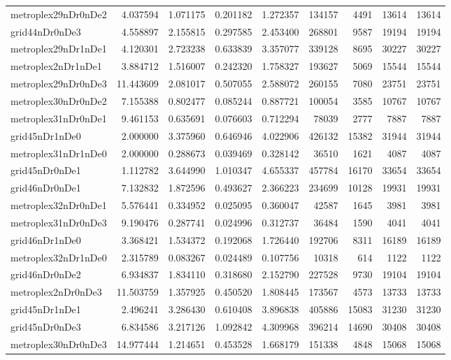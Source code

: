 \begin{longtable}{|l|r|r|r|r|r|r|r|r|}
metroplex29nDr0nDe2 & 4.037594 & 1.071175 & 0.201182 & 1.272357 & 134157 & 4491 & 13614 & 13614 \\
grid44nDr0nDe3 & 4.558897 & 2.155815 & 0.297585 & 2.453400 & 268801 & 9587 & 19194 & 19194 \\
metroplex29nDr1nDe1 & 4.120301 & 2.723238 & 0.633839 & 3.357077 & 339128 & 8695 & 30227 & 30227 \\
metroplex2nDr1nDe1 & 3.884712 & 1.516007 & 0.242320 & 1.758327 & 193627 & 5069 & 15544 & 15544 \\
metroplex29nDr0nDe3 & 11.443609 & 2.081017 & 0.507055 & 2.588072 & 260155 & 7080 & 23751 & 23751 \\
metroplex30nDr0nDe2 & 7.155388 & 0.802477 & 0.085244 & 0.887721 & 100054 & 3585 & 10767 & 10767 \\
metroplex31nDr0nDe1 & 9.461153 & 0.635691 & 0.076603 & 0.712294 & 78039 & 2777 & 7887 & 7887 \\
grid45nDr1nDe0 & 2.000000 & 3.375960 & 0.646946 & 4.022906 & 426132 & 15382 & 31944 & 31944 \\
metroplex31nDr1nDe0 & 2.000000 & 0.288673 & 0.039469 & 0.328142 & 36510 & 1621 & 4087 & 4087 \\
grid45nDr0nDe1 & 1.112782 & 3.644990 & 1.010347 & 4.655337 & 457784 & 16170 & 33654 & 33654 \\
grid46nDr0nDe1 & 7.132832 & 1.872596 & 0.493627 & 2.366223 & 234699 & 10128 & 19931 & 19931 \\
metroplex32nDr0nDe1 & 5.576441 & 0.334952 & 0.025095 & 0.360047 & 42587 & 1645 & 3981 & 3981 \\
metroplex31nDr0nDe3 & 9.190476 & 0.287741 & 0.024996 & 0.312737 & 36484 & 1590 & 4041 & 4041 \\
grid46nDr1nDe0 & 3.368421 & 1.534372 & 0.192068 & 1.726440 & 192706 & 8311 & 16189 & 16189 \\
metroplex32nDr1nDe0 & 2.315789 & 0.083267 & 0.024489 & 0.107756 & 10318 & 614 & 1122 & 1122 \\
grid46nDr0nDe2 & 6.934837 & 1.834110 & 0.318680 & 2.152790 & 227528 & 9730 & 19104 & 19104 \\
metroplex2nDr0nDe3 & 11.503759 & 1.357925 & 0.450520 & 1.808445 & 173567 & 4573 & 13733 & 13733 \\
grid45nDr1nDe1 & 2.496241 & 3.286430 & 0.610408 & 3.896838 & 405886 & 15083 & 31230 & 31230 \\
grid45nDr0nDe3 & 6.834586 & 3.217126 & 1.092842 & 4.309968 & 396214 & 14690 & 30408 & 30408 \\
metroplex30nDr0nDe3 & 14.977444 & 1.214651 & 0.453528 & 1.668179 & 151338 & 4848 & 15068 & 15068 \\

\end{longtable}
